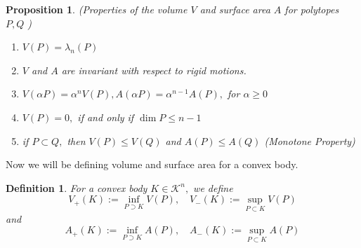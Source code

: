 \documentclass[oneside]{book}
\newtheorem{mydef}{Definition}[section]
\newtheorem{prop}{Proposition}
\begin{document}
	\begin{prop} \label{prop:1}
		(Properties of the volume $V$ and surface area $A$ for polytopes $P, Q$ )
		\begin{enumerate}
			\item  $V(P)=\lambda_{n}(P)$
			\item  $V$ and $A$ are invariant with respect to rigid motions.
			\item $V(\alpha P)=\alpha^{n} V(P), A(\alpha P)=\alpha^{n-1} A(P),$ for $\alpha \geq 0$
			\item $V(P)=0,$ if and only if $\operatorname{dim} P \leq n-1$
			\item  if $P \subset Q,$ then $V(P) \leq V(Q)$ and $A(P) \leq A(Q)$    (Monotone Property)   \label{prop:5}
		\end{enumerate}
	\end{prop}
	
	Now we will be defining volume and surface area for a convex body.\\
	\begin{mydef} \label{d:15}
		For a convex body $K \in \mathcal{K}^{n},$ we define
		$$ V_{+}(K):=\inf _{P \supset K} V(P), \quad V_{-}(K):=\sup _{P \subset K} V(P)$$ 
		and
		$$ A_{+}(K):=\inf _{P \supset K} A(P), \quad A_{-}(K):=\sup _{P \subset K} A(P) $$ 
	\end{mydef}
	
\end{document}
